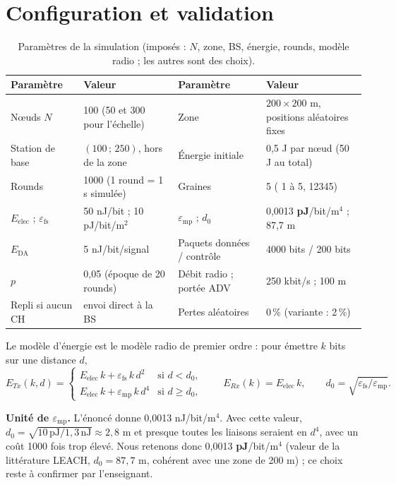\documentclass[11pt,a4paper]{article}
\renewcommand\small{\fontsize{9.5}{11}\selectfont}
\newcommand{\pct}{\,\%}
\newcommand{\code}[1]{\texttt{\detokenize{#1}}}
\begin{document}
\section{Configuration et validation}
\begin{table}[H]
\centering\small
\begin{tabular}{|l|l|l|l|}
\hline
\textbf{Paramètre} & \textbf{Valeur} & \textbf{Paramètre} & \textbf{Valeur}\\ \hline
Nœuds $N$ & 100 (50 et 300 pour l'échelle) & Zone & $200\times200$ m, positions aléatoires fixes\\
Station de base & $(100\,;\,250)$, hors de la zone & Énergie initiale & 0,5 J par nœud (50 J au total)\\
Rounds & 1000 (1 round = 1 s simulée) & Graines & 5 (\code{RngRun} 1 à 5, \code{SetSeed} 12345)\\
$E_{\mathrm{elec}}$ ; $\varepsilon_{\mathrm{fs}}$ & 50 nJ/bit ; 10 pJ/bit/m$^2$ & $\varepsilon_{\mathrm{mp}}$ ; $d_0$ & 0,0013 \textbf{pJ}/bit/m$^4$ ; 87,7 m\\
$E_{\mathrm{DA}}$ & 5 nJ/bit/signal & Paquets données / contrôle & 4000 bits / 200 bits\\
$p$ & 0,05 (époque de 20 rounds) & Débit radio ; portée ADV & 250 kbit/s ; 100 m\\
Repli si aucun CH & envoi direct à la BS & Pertes aléatoires & 0\pct{} (variante : 2\pct)\\ \hline
\end{tabular}
\caption{Paramètres de la simulation (imposés : $N$, zone, BS, énergie, rounds, modèle radio ; les autres sont des choix).}\label{tab:param}
\end{table}

Le modèle d'énergie est le modèle radio de premier ordre : pour émettre $k$ bits sur une distance $d$,
\[ E_{Tx}(k,d)=\begin{cases} E_{\mathrm{elec}}\,k+\varepsilon_{\mathrm{fs}}\,k\,d^2 & \text{si } d<d_0,\\[2pt] E_{\mathrm{elec}}\,k+\varepsilon_{\mathrm{mp}}\,k\,d^4 & \text{si } d\ge d_0,\end{cases}
\qquad E_{Rx}(k)=E_{\mathrm{elec}}\,k,\qquad d_0=\sqrt{\varepsilon_{\mathrm{fs}}/\varepsilon_{\mathrm{mp}}} . \]

\textbf{Unité de $\varepsilon_{\mathrm{mp}}$.} L'énoncé donne 0,0013 nJ/bit/m$^4$. Avec cette valeur, $d_0=\sqrt{10\,\mathrm{pJ}/1{,}3\,\mathrm{nJ}}\approx2{,}8$ m et presque toutes les liaisons seraient en $d^4$,
avec un coût 1000 fois trop élevé. Nous retenons donc 0,0013 \textbf{pJ}/bit/m$^4$ (valeur de la littérature LEACH, $d_0=87{,}7$ m, cohérent avec une zone de 200 m) ; ce choix reste à confirmer par l'enseignant.
\end{document}
